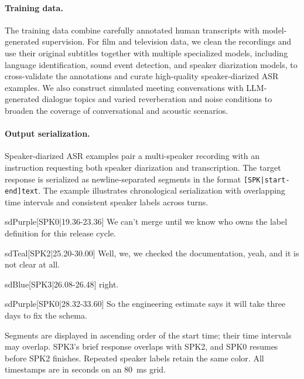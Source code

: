 \documentclass{article}
\begin{document}
\paragraph{Training data.}
The training data combine carefully annotated human transcripts with model-generated supervision. For film and television data, we clean the recordings and use their original subtitles together with multiple specialized models, including language identification, sound event detection, and speaker diarization models, to cross-validate the annotations and curate high-quality speaker-diarized ASR examples. We also construct simulated meeting conversations with LLM-generated dialogue topics and varied reverberation and noise conditions to broaden the coverage of conversational and acoustic scenarios.

\paragraph{Output serialization.}
Speaker-diarized ASR examples pair a multi-speaker recording with an instruction requesting both speaker diarization and transcription. The target response is serialized as newline-separated segments in the format \texttt{[SPK|start-end]text}. The example illustrates chronological serialization with overlapping time intervals and consistent speaker labels across turns.
\begin{sdexample}

\begin{sdsegment}{sdPurple}{[SPK0|19.36-23.36]}
We can't merge until we know who owns the label
definition for this release cycle.
\end{sdsegment}

\begin{sdsegment}{sdTeal}{[SPK2|25.20-30.00]}
Well, we, we checked the documentation, yeah,
and it is not clear at all.
\end{sdsegment}

\begin{sdsegment}{sdBlue}{[SPK3|26.08-26.48]}
right.
\end{sdsegment}

\begin{sdsegment}{sdPurple}{[SPK0|28.32-33.60]}
So the engineering estimate says it will take
three days to fix the schema.
\end{sdsegment}

\smallskip
{\footnotesize\color{black!60}
Segments are displayed in ascending order of the start time;
their time intervals may overlap.
SPK3's brief response overlaps with SPK2,
and SPK0 resumes before SPK2 finishes.
Repeated speaker labels retain the same color.
All timestamps are in seconds on an 80~ms grid.}

\end{sdexample}
\end{document}
